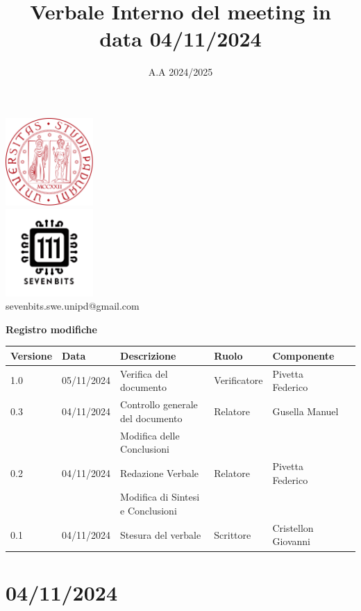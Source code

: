 \documentclass[12pt]{article}
\title{Verbale Interno del meeting in data 04/11/2024}
\date{A.A 2024/2025}
\begin{document}
\maketitle
\begin{center}
\includegraphics[width=0.25\textwidth]{LogoUnipd}\\
\includegraphics[width=0.25\textwidth]{Sevenbitslogo}\\
sevenbits.swe.unipd@gmail.com\\
\vspace{2mm}

\textbf{Registro modifiche}\\
\vspace{2mm}
\begin{tabular}{|l|l|l|l|l|l|}
\hline
\textbf{Versione} & \textbf{Data} & \textbf{Descrizione} & \textbf{Ruolo} & \textbf{Componente} \\
\hline
1.0 & 05/11/2024 & Verifica del documento & Verificatore & Pivetta Federico\\
\hline
0.3 & 04/11/2024 & Controllo generale del documento & Relatore & Gusella Manuel\\
& & Modifica delle Conclusioni & &\\
\hline
0.2 & 04/11/2024 & Redazione Verbale & Relatore & Pivetta Federico\\
& & Modifica di Sintesi e Conclusioni & & \\
\hline
0.1 & 04/11/2024 & Stesura del verbale & Scrittore & Cristellon Giovanni\\
\hline
\end{tabular}
\end{center}
\newpage
\tableofcontents
\newpage
\section{04/11/2024}
\end{document}
